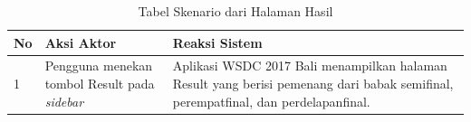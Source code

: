 \begin{enumerate}
		\begin{table}[H]
			\centering
			\begin{tabular}{|p{0.5cm}|p{7cm}|p{7cm}|}
				\hline
				No & Aksi Aktor                               & Reaksi Sistem                                          \\ \hline
				1  & Pengguna menekan tombol Result pada \textit{sidebar} & Aplikasi WSDC 2017 Bali menampilkan halaman Result yang berisi pemenang dari babak semifinal, perempatfinal, dan perdelapanfinal. \\ \hline
			\end{tabular}
			\caption{Tabel Skenario dari Halaman Hasil}
			\label{table:skenarioHalamanHasil}
		\end{table}


\end{enumerate}
